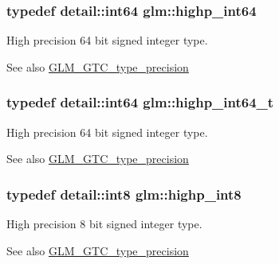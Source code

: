 \subsubsection[{\texorpdfstring{highp\+\_\+int64}{highp_int64}}]{\setlength{\rightskip}{0pt plus 5cm}typedef detail\+::int64 {\bf glm\+::highp\+\_\+int64}}\hypertarget{group__gtc__type__precision_ga7ffb27943e9569800979081bc548621c}{}\label{group__gtc__type__precision_ga7ffb27943e9569800979081bc548621c}
High precision 64 bit signed integer type. \begin{DoxySeeAlso}{See also}
\hyperlink{group__gtc__type__precision}{G\+L\+M\+\_\+\+G\+T\+C\+\_\+type\+\_\+precision} 
\end{DoxySeeAlso}
\subsubsection[{\texorpdfstring{highp\+\_\+int64\+\_\+t}{highp_int64_t}}]{\setlength{\rightskip}{0pt plus 5cm}typedef detail\+::int64 {\bf glm\+::highp\+\_\+int64\+\_\+t}}\hypertarget{group__gtc__type__precision_ga0f5186bde44471133b08057cae8a51ac}{}\label{group__gtc__type__precision_ga0f5186bde44471133b08057cae8a51ac}
High precision 64 bit signed integer type. \begin{DoxySeeAlso}{See also}
\hyperlink{group__gtc__type__precision}{G\+L\+M\+\_\+\+G\+T\+C\+\_\+type\+\_\+precision} 
\end{DoxySeeAlso}
\subsubsection[{\texorpdfstring{highp\+\_\+int8}{highp_int8}}]{\setlength{\rightskip}{0pt plus 5cm}typedef detail\+::int8 {\bf glm\+::highp\+\_\+int8}}\hypertarget{group__gtc__type__precision_ga57c86999e666760c304453f9bfdc09d1}{}\label{group__gtc__type__precision_ga57c86999e666760c304453f9bfdc09d1}
High precision 8 bit signed integer type. \begin{DoxySeeAlso}{See also}
\hyperlink{group__gtc__type__precision}{G\+L\+M\+\_\+\+G\+T\+C\+\_\+type\+\_\+precision} 
\end{DoxySeeAlso}

